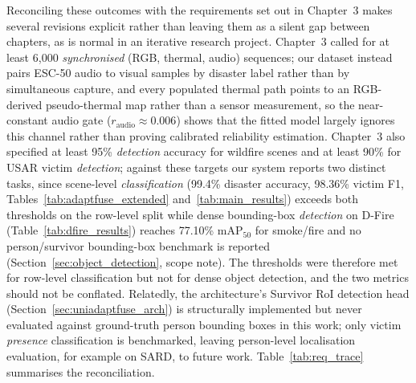 Reconciling these outcomes with the requirements set out in Chapter~3 makes several revisions explicit rather than leaving them as a silent gap between chapters, as is normal in an iterative research project. Chapter~3 called for at least 6{,}000 \textit{synchronised} (RGB, thermal, audio) sequences; our dataset instead pairs ESC-50 audio to visual samples by disaster label rather than by simultaneous capture, and every populated thermal path points to an RGB-derived pseudo-thermal map rather than a sensor measurement, so the near-constant audio gate ($r_{\text{audio}} \approx 0.006$) shows that the fitted model largely ignores this channel rather than proving calibrated reliability estimation. Chapter~3 also specified at least 95\% \textit{detection} accuracy for wildfire scenes and at least 90\% for USAR victim \textit{detection}; against these targets our system reports two distinct tasks, since scene-level \textit{classification} (99.4\% disaster accuracy, 98.36\% victim F1, Tables~\ref{tab:adaptfuse_extended} and~\ref{tab:main_results}) exceeds both thresholds on the row-level split while dense bounding-box \textit{detection} on D-Fire (Table~\ref{tab:dfire_results}) reaches 77.10\% mAP$_{50}$ for smoke/fire and no person/survivor bounding-box benchmark is reported (Section~\ref{sec:object_detection}, scope note). The thresholds were therefore met for row-level classification but not for dense object detection, and the two metrics should not be conflated. Relatedly, the architecture's Survivor RoI detection head (Section~\ref{sec:uniadaptfuse_arch}) is structurally implemented but never evaluated against ground-truth person bounding boxes in this work; only victim \textit{presence} classification is benchmarked, leaving person-level localisation evaluation, for example on SARD, to future work. Table~\ref{tab:req_trace} summarises the reconciliation.

